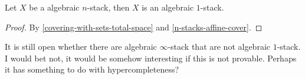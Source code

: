 \begin{corollary}
Let $X$ be a algebraic $n$-stack, then $X$ is an algebraic $1$-stack.
\end{corollary}

\begin{proof}
By \cref{covering-with-sets-total-space} and \cref{n-stacks-affine-cover}.
\end{proof}

\begin{remark}
It is still open whether there are algebraic $\infty$-stack that are not algebraic $1$-stack. I would bet not, it would be somehow interesting if this is not provable. Perhaps it has something to do with hypercompleteness?
\end{remark}



